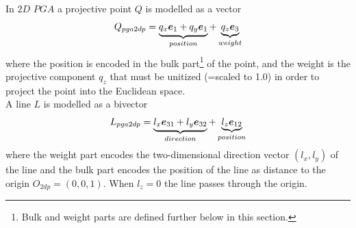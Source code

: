 In $2D$ $PGA$ a projective point $Q$ is modelled as a vector
\begin{equation}
    Q_{pga2dp} = \underbrace{q_x \bm{e}_{1} + q_y \bm{e}_{1}}_{position} +
                 \underbrace{q_z \bm{e}_{3}}_{weight}
\end{equation}
where the position is encoded in the bulk part\footnote{Bulk and weight parts are defined
further below in this section.} of the point, and the weight is the projective component
$q_z$ that must be unitized (=scaled to 1.0) in order to project the point into the
Euclidean space. \\

A line $L$ is modelled as a bivector
\begin{equation}
    L_{pga2dp} = \underbrace{l_x \bm{e}_{31} + l_y \bm{e}_{32}}_{direction} +
                 \underbrace{l_z \bm{e}_{12}}_{position}
\end{equation}
where the weight part encodes the two-dimensional direction vector $(l_x,l_y)$ of the line
and the bulk part encodes the position of the line as distance to the origin $O_{2dp} =
(0,0,1)$. When $l_z = 0$ the line passes through the origin.

